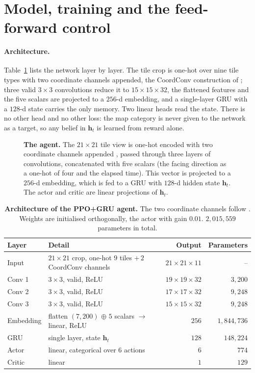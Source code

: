 \section{Model, training and the feed-forward control}
\label{app:model}

\paragraph{Architecture.}


Table~\ref{tab:arch} lists the network layer by layer. The tile crop is one-hot
over nine tile types with two coordinate channels appended, the CoordConv
construction of \citet{liu2018intriguing}; three valid $3\times3$
convolutions reduce it to $15\times15\times32$, the flattened features and the
five scalars are projected to a $256$-d embedding, and a single-layer GRU with a
$128$-d state carries the only memory. Two linear heads read the state. There is
no other head and no other loss: the map category is never given to the network
as a target, so any belief in $\mathbf{h}_t$ is learned from reward alone.

\begin{figure}[h]
    \centering
    
\caption{\textbf{The agent.} The $21\times21$ tile view is one-hot encoded with
    two coordinate channels appended \citep{liu2018intriguing}, passed through
    three layers of convolutions, concatenated with five scalars (the facing direction as a one-hot of four and the elapsed time).
    This vector is projected to a
    $256$-d embedding, which is fed to a GRU with $128$-d hidden state $\mathbf{h}_t$. The actor and critic are linear projections of $\mathbf{h}_t$.}
    \label{fig:model}
\end{figure}
\begin{table}[h]
\centering
\small
\caption{\textbf{Architecture of the PPO+GRU agent.} The two coordinate
channels follow \citet{liu2018intriguing}. Weights are initialised
orthogonally, the actor with gain $0.01$. $2{,}015{,}559$ parameters in total.}
\label{tab:arch}
\begin{tabular}{@{}llrr@{}}
\toprule
Layer & Detail & Output & Parameters \\
\midrule
Input & $21\times21$ crop, one-hot $9$ tiles $+\,2$ CoordConv channels & $21\times21\times11$ & -- \\
Conv 1 & $3\times3$, valid, ReLU & $19\times19\times32$ & $3{,}200$ \\
Conv 2 & $3\times3$, valid, ReLU & $17\times17\times32$ & $9{,}248$ \\
Conv 3 & $3\times3$, valid, ReLU & $15\times15\times32$ & $9{,}248$ \\
Embedding & flatten $(7{,}200)$ $\oplus$ $5$ scalars $\to$ linear, ReLU & $256$ & $1{,}844{,}736$ \\
GRU & single layer, state $\mathbf{h}_t$ & $128$ & $148{,}224$ \\
Actor & linear, categorical over $6$ actions & $6$ & $774$ \\
Critic & linear & $1$ & $129$ \\
\bottomrule
\end{tabular}
\end{table}

